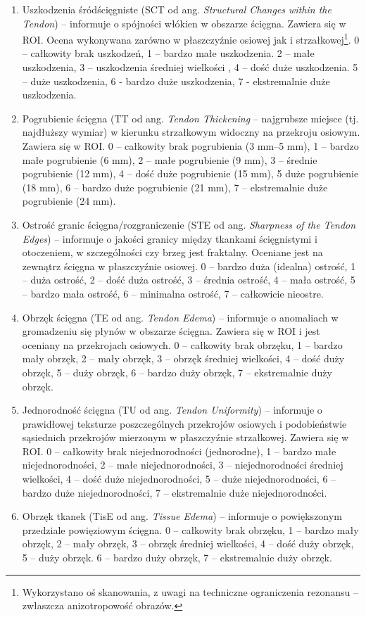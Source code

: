 \begin{enumerate}
	\item Uszkodzenia śródścięgniste (SCT od ang. \textit{Structural Changes within the Tendon}) -- informuje o spójności włókien w obszarze ścięgna. Zawiera się w ROI. Ocena wykonywana zarówno w płaszczyźnie osiowej jak i strzałkowej\footnote{Wykorzystano oś skanowania, z uwagi na techniczne ograniczenia rezonansu -- zwłaszcza anizotropowość obrazów.}. 0 – całkowity brak uszkodzeń, 1 – bardzo małe uszkodzenia. 2 – małe uszkodzenia, 3 – uszkodzenia średniej wielkości , 4 – dość duże uszkodzenia. 5 – duże uszkodzenia, 6 - bardzo duże uszkodzenia, 7 - ekstremalnie duże uszkodzenia.
	\item Pogrubienie ścięgna (TT od ang. \textit{Tendon Thickening} -- najgrubsze miejsce (tj. najdłuższy wymiar) w kierunku strzałkowym widoczny na przekroju osiowym. Zawiera się w ROI. 0 – całkowity brak pogrubienia (3 mm--5 mm), 1 – bardzo małe pogrubienie (6 mm), 2 – małe pogrubienie (9 mm), 3 – średnie pogrubienie (12 mm), 4 –  dość duże pogrubienie (15 mm), 5 duże pogrubienie (18 mm), 6 – bardzo duże pogrubienie (21 mm), 7 – ekstremalnie duże pogrubienie (24 mm).
	\item Ostrość granic ścięgna/rozgraniczenie (STE od ang. \textit{Sharpness of the Tendon Edges}) -- informuje o jakości granicy między tkankami ścięgnistymi i otoczeniem, w szczególności czy brzeg jest fraktalny. Oceniane jest na zewnątrz ścięgna w płaszczyźnie osiowej. 0 – bardzo duża (idealna) ostrość, 1 – duża ostrość, 2 – dość duża ostrość, 3 – średnia ostrość, 4 – mała ostrość, 5 – bardzo mała ostrość, 6 – minimalna ostrość, 7 – całkowicie nieostre.
	\item Obrzęk ścięgna (TE od ang. \textit{Tendon Edema}) -- informuje o anomaliach \linebreak w gromadzeniu się płynów w obszarze ścięgna. Zawiera się w ROI i jest oceniany na przekrojach osiowych. 0 – całkowity brak obrzęku, 1 – bardzo mały obrzęk, 2 – mały obrzęk, 3 – obrzęk średniej wielkości, 4 – dość duży obrzęk, 5 – duży obrzęk, 6 – bardzo duży obrzęk, 7 -- ekstremalnie duży obrzęk.
	\item Jednorodność ścięgna (TU od ang. \textit{Tendon Uniformity}) -- informuje o prawidłowej teksturze poszczególnych przekrojów osiowych i podobieństwie sąsiednich przekrojów mierzonym w płaszczyźnie strzałkowej. Zawiera się w ROI. 0 – całkowity brak niejednorodności (jednorodne), 1 – bardzo małe niejednorodności, 2 – małe niejednorodności, 3 – niejednorodności średniej wielkości, 4 – dość duże niejednorodności, 5 – duże niejednorodności, 6 – bardzo duże niejednorodności, 7 –  ekstremalnie duże niejednorodności. 
	\item Obrzęk tkanek (TisE od ang. \textit{Tissue Edema}) -- informuje o powiększonym przedziale powięziowym ścięgna. 0  – całkowity brak obrzęku, 1 – bardzo mały obrzęk, 2 – mały obrzęk, 3 – obrzęk średniej wielkości, 4 – dość duży obrzęk, 5 – duży obrzęk. 6 – bardzo duży obrzęk, 7 -- ekstremalnie duży obrzęk.
\end{enumerate}

